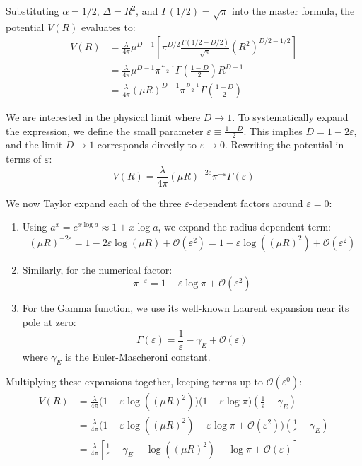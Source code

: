 Substituting $\alpha = 1/2$, $\Delta = R^2$, and $\Gamma(1/2) = \sqrt{\pi}$ into the master formula, the potential $V(R)$ evaluates to:
\[
    \begin{aligned}
        V(R) & = \frac{\lambda}{4\pi} \mu^{D-1} \left[ \pi^{D/2} \frac{\Gamma(1/2 - D/2)}{\sqrt{\pi}} (R^2)^{D/2 - 1/2} \right] \\
             & = \frac{\lambda}{4\pi} \mu^{D-1} \pi^{\frac{D-1}{2}} \Gamma\left(\frac{1-D}{2}\right) R^{D-1}                    \\
             & = \frac{\lambda}{4\pi} (\mu R)^{D-1} \pi^{\frac{D-1}{2}} \Gamma\left(\frac{1-D}{2}\right)
    \end{aligned}
\]

We are interested in the physical limit where $D \to 1$. To systematically expand the expression, we define the small parameter $\varepsilon \equiv \frac{1-D}{2}$. This implies $D = 1 - 2\varepsilon$, and the limit $D \to 1$ corresponds directly to $\varepsilon \to 0$. Rewriting the potential in terms of $\varepsilon$:
\[
    V(R) = \frac{\lambda}{4\pi} (\mu R)^{-2\varepsilon} \pi^{-\varepsilon} \Gamma(\varepsilon)
\]

We now Taylor expand each of the three $\varepsilon$-dependent factors around $\varepsilon = 0$:
\begin{enumerate}
    \item Using $a^x = e^{x \log a} \approx 1 + x \log a$, we expand the radius-dependent term:
          \[ (\mu R)^{-2\varepsilon} = 1 - 2\varepsilon \log(\mu R) + \mathcal{O}(\varepsilon^2) = 1 - \varepsilon \log((\mu R)^2) + \mathcal{O}(\varepsilon^2) \]
    \item Similarly, for the numerical factor:
          \[ \pi^{-\varepsilon} = 1 - \varepsilon \log\pi + \mathcal{O}(\varepsilon^2) \]
    \item For the Gamma function, we use its well-known Laurent expansion near its pole at zero:
          \[ \Gamma(\varepsilon) = \frac{1}{\varepsilon} - \gamma_E + \mathcal{O}(\varepsilon) \]
          where $\gamma_E$ is the Euler-Mascheroni constant.
\end{enumerate}

Multiplying these expansions together, keeping terms up to $\mathcal{O}(\varepsilon^0)$:
\[
    \begin{aligned}
        V(R) & = \frac{\lambda}{4\pi} \Big( 1 - \varepsilon \log((\mu R)^2) \Big) \Big( 1 - \varepsilon \log\pi \Big) \left( \frac{1}{\varepsilon} - \gamma_E \right)                \\
             & = \frac{\lambda}{4\pi} \Big( 1 - \varepsilon \log((\mu R)^2) - \varepsilon \log\pi + \mathcal{O}(\varepsilon^2) \Big) \left( \frac{1}{\varepsilon} - \gamma_E \right) \\
             & = \frac{\lambda}{4\pi} \left[ \frac{1}{\varepsilon} - \gamma_E - \log((\mu R)^2) - \log\pi + \mathcal{O}(\varepsilon) \right]
    \end{aligned}
\]

